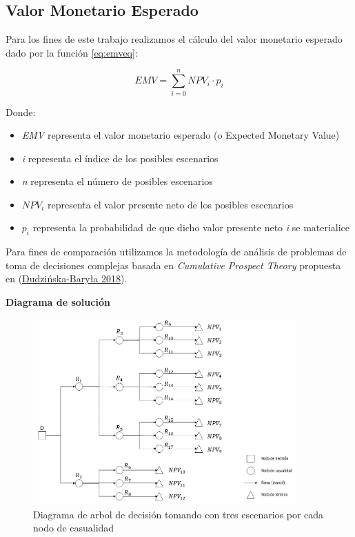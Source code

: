 \documentclass[
]{book}
\providecommand{\tightlist}{%
  \setlength{\itemsep}{0pt}\setlength{\parskip}{0pt}}
\begin{document}
\hypertarget{valor-monetario-esperado}{%
\subsection{Valor Monetario Esperado}\label{valor-monetario-esperado}}

Para los fines de este trabajo realizamos el cálculo del valor monetario esperado dado por la función \eqref{eq:emveq}:

\begin{equation}
  EMV = \sum_{i=0}^{n}NPV_{i} \cdot p_{i}
  \label{eq:emveq}
\end{equation}

Donde:

\begin{itemize}
\tightlist
\item
  \emph{EMV} representa el valor monetario esperado (o Expected Monetary Value)
\item
  \emph{i} representa el índice de los posibles escenarios
\item
  \emph{n} representa el número de posibles escenarios
\item
  \(NPV_{i}\) representa el valor presente neto de los posibles escenarios
\item
  \(p_{i}\) representa la probabilidad de que dicho valor presente neto \emph{i} se materialice
\end{itemize}

Para fines de comparación utilizamos la metodología de análisis de problemas de toma de decisiones complejas basada en \emph{Cumulative Prospect Theory} propuesta en (\protect\hyperlink{ref-Dudzinska2018}{Dudzińska-Baryła 2018}).

\textbf{Diagrama de solución}

\begin{figure}
\centering
\includegraphics[width=0.9\textwidth,height=\textheight]{Diagramas/DecisionTree.jpg}
\caption{Diagrama de arbol de decisión tomando con tres escenarios por cada nodo de casualidad}
\end{figure}
\end{document}
